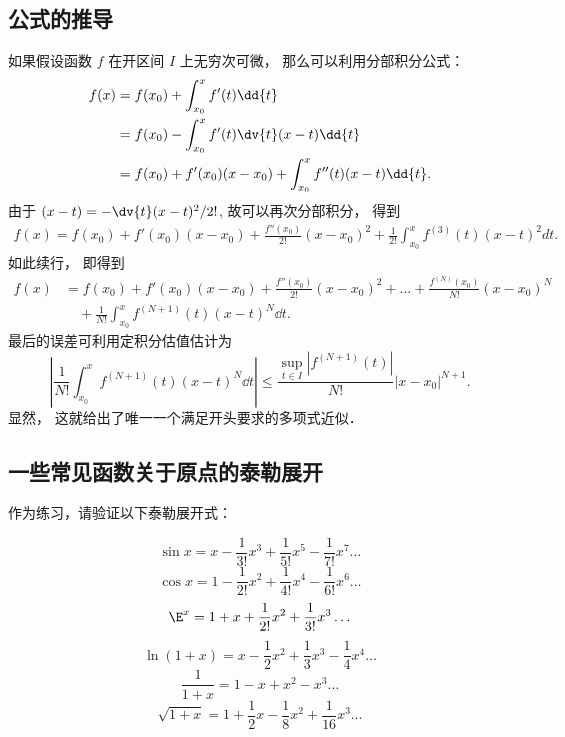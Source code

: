 \subsection{公式的推导}
如果假设函数 $f$ 在开区间 $I$ 上无穷次可微， 那么可以利用分部积分公式：
\begin{equation}
\begin{aligned}
f(x)
&=f(x_0)+\int_{x_0}^{x}f'(t)\dd{t}\\
&=f(x_0)-\int_{x_0}^{x}f'(t)\dv{t}(x-t) \dd{t}\\
&=f(x_0)+f'(x_0)(x-x_0)+\int_{x_0}^{x}f''(t)(x-t) \dd{t}.
\end{aligned}
\end{equation}
由于 $(x-t)=-\dv{t} (x-t)^2/2!$, 故可以再次分部积分， 得到
\begin{equation}
\begin{aligned}
f(x)
=f(x_0)+f'(x_0)(x-x_0)+\frac{f''(x_0)}{2!}(x-x_0)^2
+\frac{1}{2!}\int_{x_0}^{x}f^{(3)}(t)(x-t)^2dt.
\end{aligned}
\end{equation}
如此续行， 即得到
\begin{equation}
\begin{aligned}
f(x)
&=f(x_0)+f'(x_0)(x-x_0)+\frac{f''(x_0)}{2!}(x-x_0)^2+...+\frac{f^{(N)}(x_0)}{N!}(x-x_0)^N\\
&\quad+\frac{1}{N!}\int_{x_0}^{x}f^{(N+1)}(t)(x-t)^{N} \dd{t}.
\end{aligned}
\end{equation}
最后的误差可利用定积分估值估计为
\begin{equation}\label{Taylor_eq7}
\left|\frac{1}{N!}\int_{x_0}^{x}f^{(N+1)}(t)(x-t)^{N} \dd{t} \right|
\leq\frac{\sup_{t\in I}|f^{(N+1)}(t)|}{N!}|x-x_0|^{N+1}.
\end{equation}
显然， 这就给出了唯一一个满足开头要求的多项式近似．

\subsection{一些常见函数关于原点的泰勒展开}
作为练习，请验证以下泰勒展开式：

\begin{equation}
\sin x = x - \frac{1}{3!} x^3 + \frac{1}{5!} x^5 - \frac{1}{7!} x^7 \ldots
\end{equation}
\begin{equation}
\cos x = 1 - \frac{1}{2!} x^2 + \frac{1}{4!} x^4 -\frac{1}{6!} x^6 \ldots
\end{equation}
\begin{equation}\label{Taylor_eq11}
\E^x =1 + x + \frac{1}{2!} x^2 + \frac{1}{3!} x^3  \ldots
\end{equation}
\begin{equation}
\ln (1+x) = x - \frac12 x^2 + \frac13 x^3 - \frac14 x^4 \ldots
\end{equation}
\begin{equation}
\frac{1}{1+x} = 1 - x + x^2 - x^3 \ldots
\end{equation}
\begin{equation}
\sqrt{1+x} = 1 + \frac12 x - \frac18 x^2 + \frac{1}{16} x^3 \ldots
\end{equation}

